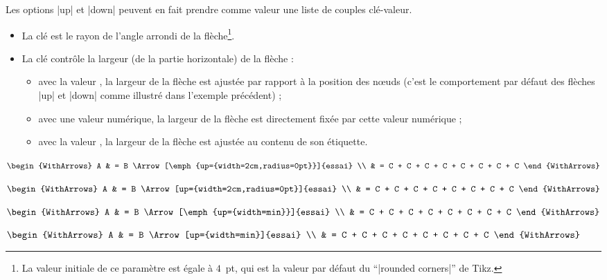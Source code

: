 \documentclass[dvipsnames]{article}%
\begin{document}
\begin{WithArrows}
\begin{WithArrows}[rr]
\vspace{1cm}
Les options |up| et |down| peuvent en fait prendre comme valeur une liste de couples
clé-valeur.  
\begin{itemize}
\item La clé  est le rayon de l'angle arrondi de la flèche\footnote{La
  valeur initiale de ce paramètre est égale à $4$~pt, qui est la valeur par défaut du
  ``|rounded corners|'' de Tikz.}.
\item La clé  contrôle la largeur (de la partie horizontale) de la flèche :
\begin{itemize}
\item avec la valeur , la largeur de la flèche est ajustée par rapport à
la position des nœuds (c'est le comportement par défaut des flèches |up| et |down| comme
illustré dans l'exemple précédent) ;
\item avec une valeur numérique, la largeur de la flèche est directement fixée par cette
valeur numérique ;
\item avec la valeur , la largeur de la flèche est ajustée au contenu de
son étiquette. 
\end{itemize}
\end{itemize}

\vspace{1cm}
\begin{Code}
$\begin{WithArrows}
A & = B 
\Arrow[\emph{up={width=2cm,radius=0pt}}]{essai} \\
  & = C + C + C + C + C + C + C + C 
\end{WithArrows}$
\end{Code}

\medskip
$\begin{WithArrows}
A & = B 
\Arrow[up={width=2cm,radius=0pt}]{essai} \\
  & = C + C + C + C + C + C + C + C 
\end{WithArrows}$


\vspace{1cm}
\begin{Code}
$\begin{WithArrows}
A & = B 
\Arrow[\emph{up={width=min}}]{essai} \\
  & = C + C + C + C + C + C + C + C 
\end{WithArrows}$
\end{Code}

\medskip
$\begin{WithArrows}
A & = B 
\Arrow[up={width=min}]{essai} \\
  & = C + C + C + C + C + C + C + C 
\end{WithArrows}$


\end{WithArrows}
\end{WithArrows}
\end{document}

